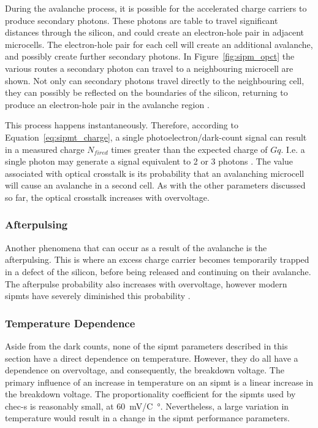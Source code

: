 During the avalanche process, it is possible for the accelerated charge carriers to produce secondary photons. These photons are table to travel significant distances through the silicon, and could create an electron-hole pair in adjacent microcells. The electron-hole pair for each cell will create an additional avalanche, and possibly create further secondary photons. In Figure~\ref{fig:sipm_opct} the various routes a secondary photon can travel to a neighbouring microcell are shown. Not only can secondary photons travel directly to the neighbouring cell, they can possibly be reflected on the boundaries of the silicon, returning to produce an electron-hole pair in the avalanche region \cite{Rech2008}.

This process happens instantaneously. Therefore, according to Equation~\ref{eq:sipmt_charge}, a single photoelectron/dark-count signal can result in a measured charge $N_{fired}$ times greater than the expected charge of $G q$. I.e. a single photon may generate a signal equivalent to 2 or 3 photons \cite{SensL2011}. The value associated with optical crosstalk is its probability that an avalanching microcell will cause an avalanche in a second cell. As with the other parameters discussed so far, the optical crosstalk increases with overvoltage.

\subsubsection{Afterpulsing}

Another phenomena that can occur as a result of the avalanche is the afterpulsing. This is where an excess charge carrier becomes temporarily trapped in a defect of the silicon, before being released and continuing on their avalanche. The afterpulse probability also increases with overvoltage, however modern \glspl{sipmt} have severely diminished this probability \cite{Ghassemi2017,SensL2011}.

\subsubsection{Temperature Dependence}

Aside from the dark counts, none of the \gls{sipmt} parameters described in this section have a direct dependence on temperature. However, they do all have a dependence on overvoltage, and consequently, the breakdown voltage. The primary influence of an increase in temperature on an \gls{sipmt} is a linear increase in the breakdown voltage. The proportionality coefficient for the \glspl{sipmt} used by \gls{chec-s} is reasonably small, at \SI{60}{mV/C\degree}. Nevertheless, a large variation in temperature would result in a change in the \gls{sipmt} performance parameters.

